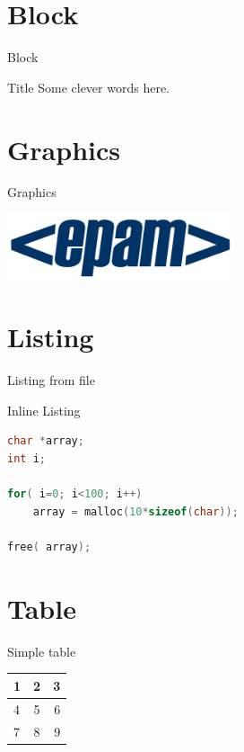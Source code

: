 \section{Block}
\begin{frame}{Block}
	\begin{block}{Title}
	    Some clever words here.
	\end{block}
\end{frame}

\section{Graphics}
\begin{frame}{Graphics}
    \begin{center}
	\includegraphics[width=0.5\textwidth]{pic/epam}
    \end{center}
\end{frame}

\section{Listing}
\begin{frame}[fragile]{Listing from file}

    

\end{frame}

\begin{frame}[fragile]{Inline Listing}

	\begin{lstlisting}[language=C]
char *array;
int i;

for( i=0; i<100; i++)
    array = malloc(10*sizeof(char));

free( array);
	\end{lstlisting}
\end{frame}

\section{Table}

\begin{frame}{Simple table}

    \begin{tabular}{| l || c | r |}
      \hline
	  1 & 2 & 3 \\ \hline 
	  4 & 5 & 6 \\
	  7 & 8 & 9 \\
      \hline
    \end{tabular}
\end{frame}

